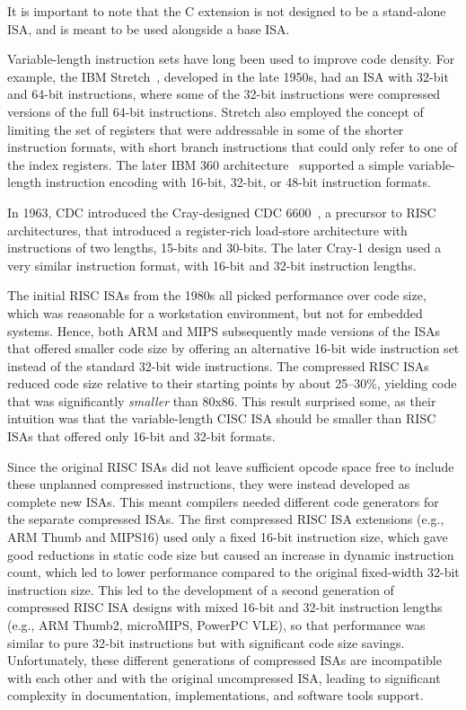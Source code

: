 It is important to note that the C extension is not designed to be a
stand-alone ISA, and is meant to be used alongside a base ISA.

\begin{commentary}
Variable-length instruction sets have long been used to improve code
density.  For example, the IBM Stretch~\cite{stretch}, developed in
the late 1950s, had an ISA with 32-bit and 64-bit instructions, where
some of the 32-bit instructions were compressed versions of the full
64-bit instructions.  Stretch also employed the concept of limiting
the set of registers that were addressable in some of the shorter
instruction formats, with short branch instructions that could only
refer to one of the index registers.  The later IBM 360
architecture~\cite{ibm360} supported a simple variable-length
instruction encoding with 16-bit, 32-bit, or 48-bit instruction
formats.

In 1963, CDC introduced the Cray-designed CDC 6600~\cite{cdc6600}, a
precursor to RISC architectures, that introduced a register-rich
load-store architecture with instructions of two lengths, 15-bits and
30-bits.  The later Cray-1 design used a very similar instruction
format, with 16-bit and 32-bit instruction lengths.

The initial RISC ISAs from the 1980s all picked performance over code
size, which was reasonable for a workstation environment, but not for
embedded systems. Hence, both ARM and MIPS subsequently made versions
of the ISAs that offered smaller code size by offering an alternative
16-bit wide instruction set instead of the standard 32-bit wide
instructions.  The compressed RISC ISAs reduced code size relative to
their starting points by about 25--30\%, yielding code that was
significantly \emph{smaller} than 80x86.  This result surprised some,
as their intuition was that the variable-length CISC ISA should be
smaller than RISC ISAs that offered only 16-bit and 32-bit formats.

Since the original RISC ISAs did not leave sufficient opcode space
free to include these unplanned compressed instructions, they were
instead developed as complete new ISAs.  This meant compilers needed
different code generators for the separate compressed ISAs.  The first
compressed RISC ISA extensions (e.g., ARM Thumb and MIPS16) used only
a fixed 16-bit instruction size, which gave good reductions in static
code size but caused an increase in dynamic instruction count, which
led to lower performance compared to the original fixed-width 32-bit
instruction size.  This led to the development of a second generation
of compressed RISC ISA designs with mixed 16-bit and 32-bit
instruction lengths (e.g., ARM Thumb2, microMIPS, PowerPC VLE), so
that performance was similar to pure 32-bit instructions but with
significant code size savings.  Unfortunately, these different
generations of compressed ISAs are incompatible with each other and
with the original uncompressed ISA, leading to significant complexity
in documentation, implementations, and software tools support.


\end{commentary}
